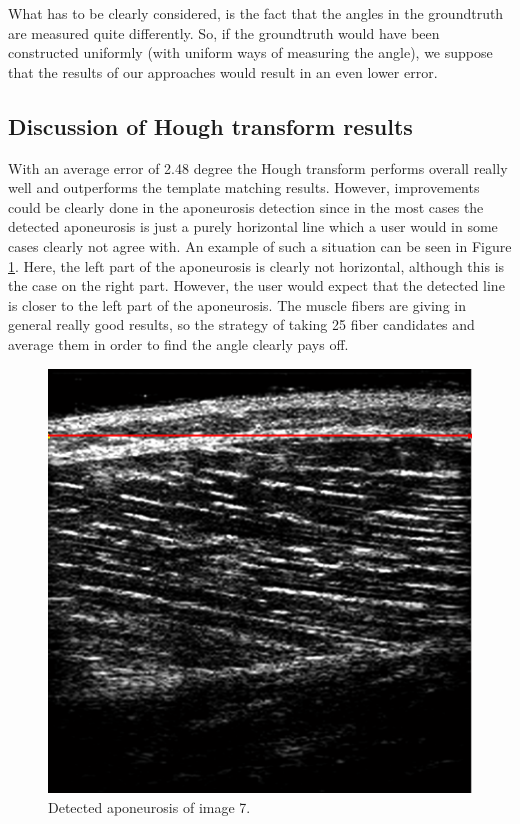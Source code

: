 \documentclass[10pt,twocolumn,letterpaper]{article}
\begin{document}
What has to be clearly considered, is the fact that the angles in the groundtruth are measured quite differently. So, if the groundtruth would have been constructed uniformly (with uniform ways of measuring the angle), we suppose that the results of our approaches would result in an even lower error.


\subsection{Discussion of Hough transform results}

With an average error of 2.48 degree the Hough transform performs overall really well and outperforms the template matching results. 
However, improvements could be clearly done in the aponeurosis detection since in the most cases the detected aponeurosis is just a purely horizontal line which a user would in some cases clearly not agree with. An example of such a situation can be seen in Figure \ref{fig:im7_hough_apo}. Here, the left part of the aponeurosis is clearly not horizontal, although this is the case on the right part. However, the user would expect that the detected line is closer to the left part of the aponeurosis.
The muscle fibers are giving in general really good results, so the strategy of taking 25 fiber candidates and average them in order to find the angle clearly pays off.

\begin{figure}
	\begin{center}		
		\includegraphics[width=1\linewidth]{img/im7_hough_apo}
	\end{center}
	\caption{Detected aponeurosis of image 7.}
	\label{fig:im7_hough_apo}
	
\end{figure}
\end{document}
